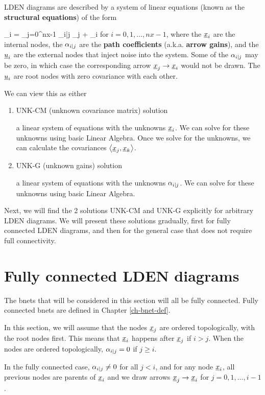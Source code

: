 LDEN diagrams are described by 
a system of linear equations 
(known as the {\bf structural equations}) of the form

\beq
\rvx_i = \sum_{j=0}^{nx-1} \alp_{i|j} 
\rvx_j + \rvu_i
\eeq
for $i=0, 1, \dots, nx-1$,
where the 
$\rvx_i$ are the internal nodes,
the $\alpha_{i|j}$
are
the {\bf path coefficients} 
(a.k.a. {\bf arrow gains}), and the
$\rvu_i$ 
are the external nodes 
that inject noise into the system.
Some of the $\alpha_{i|j}$ may
be zero,
in which case
the
corresponding arrow
$\rvx_j\rarrow \rvx_i$
would not be drawn.
The $\rvu_i$ are
root nodes with
zero covariance
with each other.

We can view this as either

\begin{enumerate}
\item UNK-CM (unknown covariance matrix) solution

a linear system 
of equations with the unknowns 
$\rvx_i$. We can solve for these
unknowns using basic Linear Algebra.
Once we solve for the unknowns,
we can calculate the covariances $\av{\rvx_j, \rvx_k}$.

\item UNK-G (unknown gains) solution

a linear system 
of equations with the
unknowns $\alpha_{i|j}$. We can solve for these
unknowns using basic Linear Algebra.

\end{enumerate}

Next, we will find the 2
solutions UNK-CM and UNK-G 
explicitly for arbitrary LDEN
diagrams.
We will present these solutions 
gradually, first for fully connected 
LDEN diagrams, and then for the
general case that does not require
full connectivity.

\section{Fully connected 
LDEN diagrams}
The bnets that will be
considered in this section
will all be fully connected.
Fully connected
bnets are
defined in Chapter \ref{ch-bnet-def}.

In this section, we will assume that
the nodes $\rvx_j$ are ordered topologically,
with the root nodes first.
This means that $\rvx_i$ happens after
$\rvx_j$ if $i>j$.
When the nodes are ordered topologically,
$\alpha_{i|j}=0$ if $j\geq i$.

In the fully connected case, $\alpha_{i|j}\neq 0$
for all $j<i$,
and for any node $\rvx_i$, all previous nodes
are parents of $\rvx_i$ and we draw arrows  
$\rvx_j\rarrow\rvx_i$ for $j=0, 1, \ldots, i-1$.

